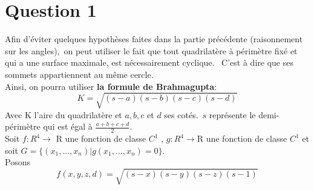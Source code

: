 \documentclass[12pt]{report}
\begin{document}
\section{Question 1}
Afin d'éviter quelques hypothèses faites dans la partie précédente (raisonnement sur les angles),\ on peut utiliser le fait que tout quadrilatère à périmètre fixé et qui a une surface maximale, est nécessairement cyclique. \ C'est à dire que ses sommets appartiennent au même cercle.\\
Ainsi, on pourra utiliser \textbf{la formule de Brahmagupta}:
\begin{equation}
   K={\sqrt{(s-a)(s-b)(s-c)(s-d)}} 
\end{equation}
Avec K l'aire du quadrilatère et $a,b,c$ et $d$ ses cotés.\ $s$ représente le demi-périmètre qui est égal à $\frac{a+b+c+d}{2}$.\\
\indent Soit $f:R^{4}\longrightarrow$ R une fonction de classe $C^{1}$ , $g:R^{4}\longrightarrow$R une fonction de classe
$C^{1}$ et soit $ G = \lbrace (x_{1},...,x_{n})\vert g(x_{1},...,x_{n})=0\rbrace.$\\
\indent Posons 
\begin{equation}
    f(x,y,z,d)={\sqrt{(s-x)(s-y)(s-z)(s-1)}} 
\end{equation}
\end{document}
